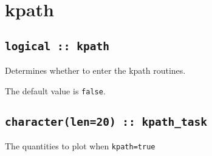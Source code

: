 \clearpage
\section{kpath}

\subsection[berry]{\tt logical :: kpath}
Determines whether to enter the kpath routines.

The default value is \verb#false#.


\subsection[kpath\_task]{\tt character(len=20) ::  kpath\_task} 
The quantities to plot when {\tt kpath=true} 

